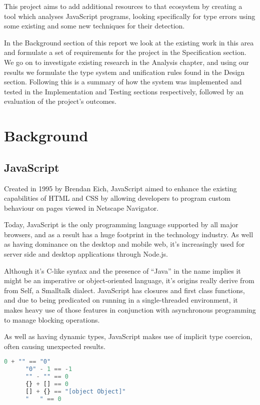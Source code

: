 \documentclass[british, twoside]{bhamthesis}
\theoremstyle{definition}
\begin{document}
  This project aims to add additional resources to that ecosystem by creating a tool which analyses JavaScript programs, looking specifically for type errors using some existing and some new techniques for their detection.

  In the Background section of this report we look at the existing work in this area and formulate a set of requirements for the project in the Specification section. We go on to investigate existing research in the Analysis chapter, and using our results we formulate the type system and unification rules found in the Design section. Following this is a summary of how the system was implemented and tested in the Implementation and Testing sections respectively, followed by an evaluation of the project's outcomes.

\chapter{Background}

  \section{JavaScript}
    Created in 1995 by Brendan Eich, JavaScript aimed to enhance the existing capabilities of HTML and CSS by allowing developers to program custom behaviour on pages viewed in Netscape Navigator.

    Today, JavaScript is the only programming language supported by all major browsers, and as a result has a huge footprint in the technology industry. As well as having dominance on the desktop and mobile web, it's increasingly used for server side and desktop applications through Node.js.

    Although it’s C-like syntax and the presence of “Java” in the name implies it might be an imperative or object-oriented language, it’s origins really derive from from Self, a Smalltalk dialect. JavaScript has closures and first class functions, and due to being predicated on running in a single-threaded environment, it makes heavy use of those features in conjunction with asynchronous programming to manage blocking operations.

    As well as having dynamic types, JavaScript makes use of implicit type coercion, often causing unexpected results.

    \begin{lstlisting}[language=JavaScript]
      0 + "" == "0"
      "0" - 1 == -1
      "" - "" == 0
      {} + [] == 0
      [] + {} == "[object Object]"
      "   " == 0
    \end{lstlisting}
\end{document}
